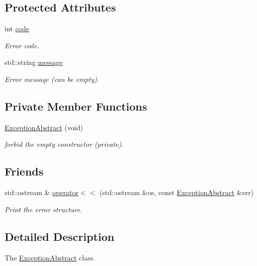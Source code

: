 \subsection*{Protected Attributes}
\begin{DoxyCompactItemize}
\item 
int \hyperlink{classdynamic__graph_1_1ExceptionAbstract_a160cf3cd35aad75738f8b26c5cec6fdc}{code}
\begin{DoxyCompactList}\small\item\em Error code. \end{DoxyCompactList}\item 
std\+::string \hyperlink{classdynamic__graph_1_1ExceptionAbstract_a9622b93d152c08ab80ed4b48ea24380b}{message}
\begin{DoxyCompactList}\small\item\em Error message (can be empty). \end{DoxyCompactList}\end{DoxyCompactItemize}
\subsection*{Private Member Functions}
\begin{DoxyCompactItemize}
\item 
\hyperlink{classdynamic__graph_1_1ExceptionAbstract_a474009850ce7a50c121e4c4294181e79}{Exception\+Abstract} (void)
\begin{DoxyCompactList}\small\item\em forbid the empty constructor (private). \end{DoxyCompactList}\end{DoxyCompactItemize}
\subsection*{Friends}
\begin{DoxyCompactItemize}
\item 
std\+::ostream \& \hyperlink{classdynamic__graph_1_1ExceptionAbstract_af1ab4fed15cda5c7de2c9c4f809bd611}{operator$<$$<$} (std\+::ostream \&os, const \hyperlink{classdynamic__graph_1_1ExceptionAbstract}{Exception\+Abstract} \&err)
\begin{DoxyCompactList}\small\item\em Print the error structure. \end{DoxyCompactList}\end{DoxyCompactItemize}


\subsection{Detailed Description}
The \hyperlink{classdynamic__graph_1_1ExceptionAbstract}{Exception\+Abstract} class. 


